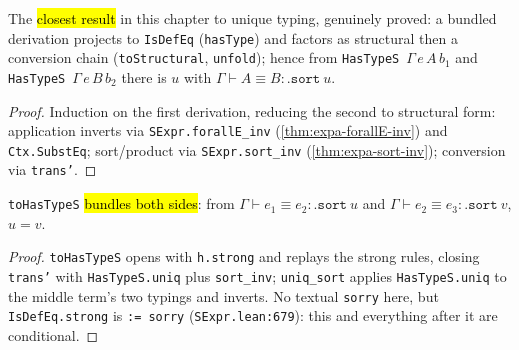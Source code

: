 \begin{theorem}
\label{thm:expb-hastypes-uniq}
\leanok
{}

 The \hl{closest result} in this chapter to unique typing, genuinely proved: a
bundled derivation projects to \texttt{IsDefEq} (\texttt{hasType}) and factors as structural then a
conversion chain (\texttt{toStructural}, \texttt{unfold}); hence from
\texttt{HasTypeS}~$\Gamma\,e\,A\,b_1$ and \texttt{HasTypeS}~$\Gamma\,e\,B\,b_2$ there is $u$ with
$\Gamma\vdash A\equiv B:\mathtt{.sort}\ u$.
\end{theorem}
\begin{proof}
\leanok
{} Induction on the first derivation, reducing the second to structural form: application
inverts via \texttt{SExpr.forallE\_inv} (\ref{thm:expa-forallE-inv}) and \texttt{Ctx.SubstEq};
sort/product via \texttt{SExpr.sort\_inv} (\ref{thm:expa-sort-inv}); conversion via \texttt{trans'}.
\end{proof}

\begin{theorem}
\label{thm:expb-uniq-sort}
\leanok
{}

 \texttt{toHasTypeS} \hl{bundles both sides}: from $\Gamma\vdash e_1\equiv
e_2:\mathtt{.sort}\ u$ and $\Gamma\vdash e_2\equiv e_3:\mathtt{.sort}\ v$, $u=v$.
\end{theorem}
\begin{proof}
\leanok
{} \texttt{toHasTypeS} opens with \texttt{h.strong} and replays the strong rules, closing
\texttt{trans'} with \texttt{HasTypeS.uniq} plus \texttt{sort\_inv}; \texttt{uniq\_sort} applies
\texttt{HasTypeS.uniq} to the middle term's two typings and inverts.
 No textual \texttt{sorry} here, but \texttt{IsDefEq.strong} is \texttt{:= sorry}
(\texttt{SExpr.lean:679}): this and everything after it are conditional.
\end{proof}

